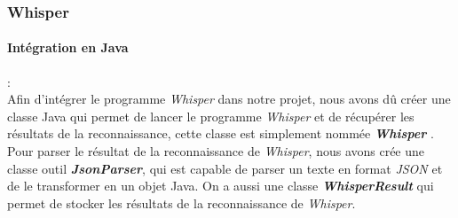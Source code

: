 \subsubsection*{Whisper}
\label{sec:whisperImpl}

\paragraph*{Intégration en Java} : \\

Afin d'intégrer le programme \textit{Whisper} dans notre projet, nous avons dû créer une classe Java qui permet de lancer le programme \textit{Whisper} et de récupérer les résultats de la reconnaissance, cette classe est simplement nommée \textbf{\textit{Whisper}} . Pour parser le résultat de la reconnaissance de \textit{Whisper}, nous avons crée une classe outil \textbf{\textit{JsonParser}}, qui est capable de parser un texte en format \textit{JSON} et de le transformer en un objet Java. On a aussi une classe \textbf{\textit{WhisperResult}} qui permet de stocker les résultats de la reconnaissance de \textit{Whisper}.